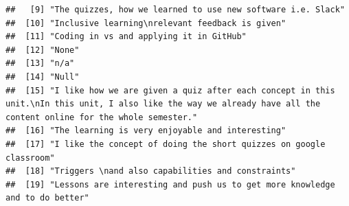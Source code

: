 \documentclass[
]{article}
\begin{document}
\begin{verbatim}
##   [9] "The quizzes, how we learned to use new software i.e. Slack"                                                                                                                                                                                       
##  [10] "Inclusive learning\nrelevant feedback is given"                                                                                                                                                                                                   
##  [11] "Coding in vs and applying it in GitHub"                                                                                                                                                                                                           
##  [12] "None"                                                                                                                                                                                                                                             
##  [13] "n/a"                                                                                                                                                                                                                                              
##  [14] "Null"                                                                                                                                                                                                                                             
##  [15] "I like how we are given a quiz after each concept in this unit.\nIn this unit, I also like the way we already have all the content online for the whole semester."                                                                                
##  [16] "The learning is very enjoyable and interesting"                                                                                                                                                                                                   
##  [17] "I like the concept of doing the short quizzes on google classroom"                                                                                                                                                                                
##  [18] "Triggers \nand also capabilities and constraints"                                                                                                                                                                                                 
##  [19] "Lessons are interesting and push us to get more knowledge and to do better"                                                                                                                                                                       

\end{verbatim}
\end{document}
